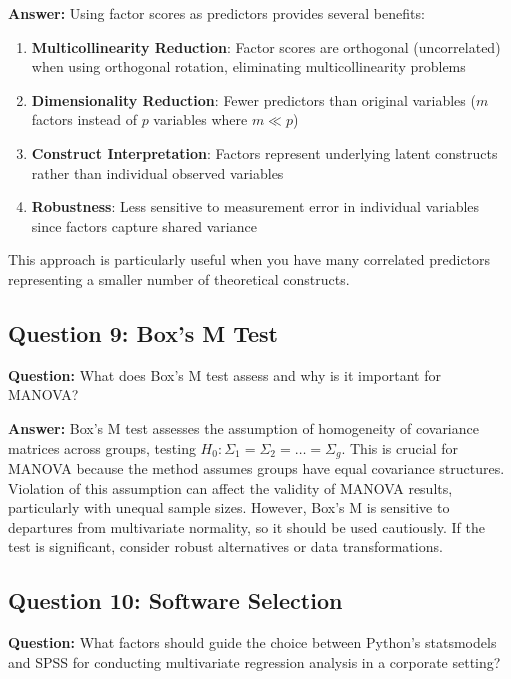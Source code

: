 \documentclass[
]{article}
\begin{document}
\textbf{Answer:} Using factor scores as predictors provides several
benefits:

\begin{enumerate}
\item
  \textbf{Multicollinearity Reduction}: Factor scores are orthogonal
  (uncorrelated) when using orthogonal rotation, eliminating
  multicollinearity problems
\item
  \textbf{Dimensionality Reduction}: Fewer predictors than original
  variables (\(m\) factors instead of \(p\) variables where \(m \ll p\))
\item
  \textbf{Construct Interpretation}: Factors represent underlying latent
  constructs rather than individual observed variables
\item
  \textbf{Robustness}: Less sensitive to measurement error in individual
  variables since factors capture shared variance
\end{enumerate}

This approach is particularly useful when you have many correlated
predictors representing a smaller number of theoretical constructs.

\textbf{ }

\subsection{Question 9: Box's M Test}

\textbf{Question:} What does Box's M test assess and why is it important
for MANOVA?

\textbf{Answer:} Box's M test assesses the assumption of homogeneity of
covariance matrices across groups, testing
\(H_{0}:\Sigma_{1} = \Sigma_{2} = \ldots = \Sigma_{g}\). This is crucial
for MANOVA because the method assumes groups have equal covariance
structures. Violation of this assumption can affect the validity of
MANOVA results, particularly with unequal sample sizes. However, Box's M
is sensitive to departures from multivariate normality, so it should be
used cautiously. If the test is significant, consider robust
alternatives or data transformations.

\textbf{ }

\subsection{Question 10: Software Selection}

\textbf{Question:} What factors should guide the choice between Python's
statsmodels and SPSS for conducting multivariate regression analysis in
a corporate setting?
\end{document}
